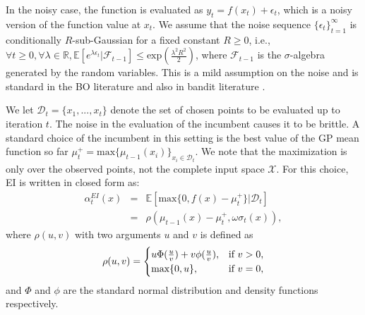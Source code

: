 \documentclass[twoside]{article}
\begin{document}
In the noisy case, the function is evaluated as $y_t = f(x_t) + \epsilon_t$, which is a noisy version of the function value at $x_t$. We assume that the noise sequence $\{\epsilon_t\}_{t=1}^{\infty}$ is conditionally $R$-sub-Gaussian for a fixed constant $R \ge 0$, i.e.,
$\forall t \ge 0, \forall \lambda \in \mathbb{R}, \mathbb{E}[e^{\lambda\epsilon_t}| \mathcal F_{t-1}] \le \text{exp}(\frac{\lambda^2R^2}{2})$, where $\mathcal F_{t-1}$ is the $\sigma$-algebra generated by the random variables. This is a mild assumption on the noise and is standard in the BO literature \citep{Chowdhury17} and also in bandit literature \citep{Abbasi11}.

We let $\mathcal D_{t} = \{x_1 ,..., x_t\}$ denote the set of chosen points to be evaluated up to iteration $t$. The noise in the evaluation of the incumbent causes it to be brittle. A standard choice of the incumbent in this setting is the best value of the GP mean function so far $\mu^+_t = \text{max} \{\mu_{t-1}(x_i)\}_{x_i \in \mathcal D_t}$. We note that the maximization is only over the observed points, not the complete input space $\mathcal X$. For this choice, EI is written in closed form as:
\begin{eqnarray}
\alpha_t^{EI}(x) & = & \mathbb{E}[\text{max}\{0, f(x) - \mu^+_{t}\}|\mathcal D_t] \\
& = & \rho(\mu_{t-1}(x) - \mu^+_{t}, \omega \sigma_t(x)),
\end{eqnarray}
where $\rho(u,v)$ with two arguments $u$ and $v$ is defined as
\begin{equation}
  \rho(u,v)=\begin{cases}
    u\Phi(\frac{u}{v}) + v\phi(\frac{u}{v}), & \text{if $ v > 0$},\\
    \text{max} \{0, u\}, & \text{if $ v= 0$},
  \end{cases}
\label{eq1}
\end{equation}
and $\Phi$ and $\phi$ are the standard normal distribution and density functions respectively.
\end{document}
